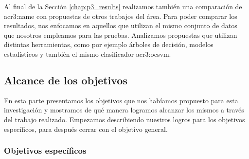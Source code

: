 Al final de la Sección \ref{chap:p3_results} realizamos también una comparación
de \gls{acr3:name} con propuestas de otros trabajos del área. Para poder
comparar los resultados, nos enfocamos en aquellos que utilizan el mismo
conjunto de datos que nosotros empleamos para las pruebas. Analizamos
propuestas que utilizan distintas herramientas, como por ejemplo árboles
de decisión, modelos estadísticos y también el mismo clasificador
\gls{acr3:ocsvm}.


\subsection{Alcance de los objetivos}

En esta parte presentamos los objetivos que nos habíamos propuesto
para esta investigación y mostramos de qué manera logramos
alcanzar los mismos a través del trabajo realizado.
Empezamos describiendo nuestros logros para los objetivos
específicos, para después cerrar con el objetivo general.


\subsubsection{Objetivos específicos}

